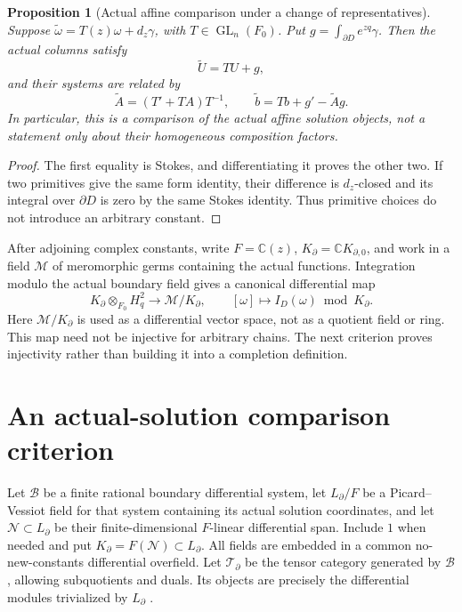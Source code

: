 \documentclass[11pt]{article}
\numberwithin{equation}{section}
\newtheorem{proposition}[proposition]{Proposition}
\theoremstyle{definition}
\theoremstyle{remark}
\newcommand{\C}{\mathbb C}
\newcommand{\GL}{\operatorname{GL}}
\newcommand{\Hq}{H_q^2}
\newcommand{\M}{\mathscr M}
\newcommand{\Ncal}{\mathcal N}
\newcommand{\Tcal}{\mathcal T}
\begin{document}
\begin{proposition}[Actual affine comparison under a change of representatives]
\label{prop:gauge}
Suppose
$\widetilde\omega=T(z)\omega+d_z\gamma$, with $T\in\GL_n(F_0)$.
Put $g=\int_{\partial D}e^{zq}\gamma$. Then the actual columns satisfy
\[
 \widetilde U=TU+g,
\]
and their systems are related by
\[
 \widetilde A=(T'+TA)T^{-1},\qquad
 \widetilde b=Tb+g'-\widetilde A g.
\]
In particular, this is a comparison of the actual affine solution objects,
not a statement only about their homogeneous composition factors.
\end{proposition}
\begin{proof}
The first equality is Stokes, and differentiating it proves the other two.
If two primitives give the same form identity, their difference is
$d_z$-closed and its integral over $\partial D$ is zero by the same Stokes
identity. Thus primitive choices do not introduce an arbitrary constant.
\end{proof}

After adjoining complex constants, write $F=\C(z)$,
$K_\partial=\C K_{\partial,0}$, and work in a field $\M$ of meromorphic
germs containing the actual functions. Integration modulo the actual
boundary field gives a canonical differential map
\begin{equation}\label{eq:canonical-comparison}
 K_\partial\otimes_{F_0}\Hq\longrightarrow\M/K_\partial,
 \qquad [\omega]\longmapsto I_D(\omega)\bmod K_\partial.
\end{equation}
Here $\M/K_\partial$ is used as a differential vector space, not as a
quotient field or ring. This map need not be injective for arbitrary chains.
The next criterion proves injectivity rather than building it into a
completion definition.

\section{An actual-solution comparison criterion}\label{sec:criterion}
Let $\mathcal B$ be a finite rational boundary differential system, let
$L_\partial/F$ be a Picard--Vessiot field for that system containing its
actual solution coordinates, and let $\Ncal\subset L_\partial$ be their
finite-dimensional $F$-linear differential span. Include $1$ when needed and put $K_\partial=F(\Ncal)\subset L_\partial$. All fields are embedded in a common no-new-constants differential overfield.
Let $\Tcal_\partial$ be the tensor category generated by $\mathcal B$,
allowing subquotients and duals. Its objects are precisely the differential
modules trivialized by $L_\partial$ \cite[Theorem 1.5.2]{Singer}.
\end{document}
